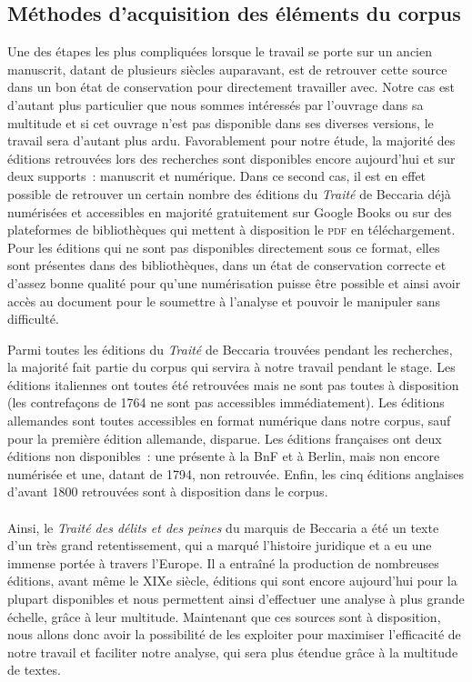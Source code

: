 \subsection{Méthodes d'acquisition des éléments du corpus}
Une des étapes les plus compliquées lorsque le travail se porte sur un ancien manuscrit, datant de plusieurs siècles auparavant, est de retrouver cette source dans un bon état de conservation pour directement travailler avec. Notre cas est d'autant plus particulier que nous sommes intéressés par l'ouvrage dans sa multitude et si cet ouvrage n'est pas disponible dans ses diverses versions, le travail sera d'autant plus ardu. Favorablement pour notre étude, la majorité des éditions retrouvées lors des recherches sont disponibles encore aujourd'hui et sur deux supports~: manuscrit et numérique. Dans ce second cas, il est en effet possible de retrouver un certain nombre des éditions du \emph{Traité} de Beccaria déjà numérisées et accessibles en majorité gratuitement sur Google Books ou sur des plateformes de bibliothèques qui mettent à disposition le \textsc{pdf} en téléchargement. Pour les éditions qui ne sont pas disponibles directement sous ce format, elles sont présentes dans des bibliothèques, dans un état de conservation correcte et d'assez bonne qualité pour qu'une numérisation puisse être possible et ainsi avoir accès au document pour le soumettre à l'analyse et pouvoir le manipuler sans difficulté. 

Parmi toutes les éditions du \emph{Traité} de Beccaria trouvées pendant les recherches, la majorité fait partie du corpus qui servira à notre travail pendant le stage. Les éditions italiennes ont toutes été retrouvées mais ne sont pas toutes à disposition (les contrefaçons de 1764 ne sont pas accessibles immédiatement). Les éditions allemandes sont toutes accessibles en format numérique dans notre corpus, sauf pour la première édition allemande, disparue. Les éditions françaises ont deux éditions non disponibles~: une présente à la BnF et à Berlin, mais non encore numérisée et une, datant de 1794, non retrouvée. Enfin, les cinq éditions anglaises d'avant 1800 retrouvées sont à disposition dans le corpus. 

\paragraph{} Ainsi, le \emph{Traité des délits et des peines} du marquis de Beccaria a été un texte d'un très grand retentissement, qui a marqué l'histoire juridique et a eu une immense portée à travers l'Europe. Il a entraîné la production de nombreuses éditions, avant même le XIXe siècle, éditions qui sont encore aujourd'hui pour la plupart disponibles et nous permettent ainsi d'effectuer une analyse à plus grande échelle, grâce à leur multitude. Maintenant que ces sources sont à disposition, nous allons donc avoir la possibilité de les exploiter pour maximiser l'efficacité de notre travail et faciliter notre analyse, qui sera plus étendue grâce à la multitude de textes.
